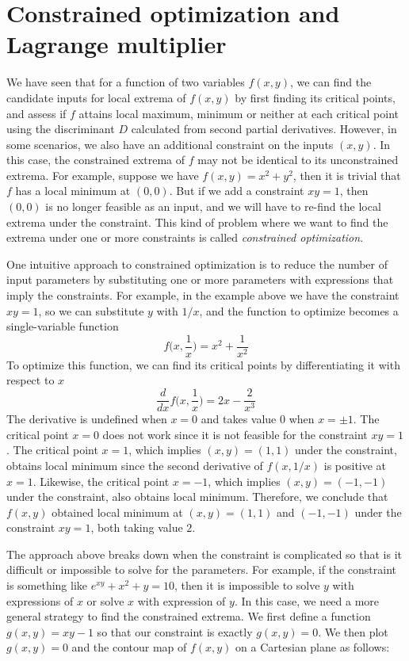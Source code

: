 \section{Constrained optimization and Lagrange multiplier}
We have seen that for a function of two variables $f(x,y)$, we can find the candidate inputs for local extrema of $f(x,y)$ by first finding its critical points, and assess if $f$ attains local maximum, minimum or neither at each critical point using the discriminant $D$ calculated from second partial derivatives.  However, in some scenarios, we also have an additional constraint on the inputs $(x,y)$.  In this case, the constrained extrema of $f$ may not be identical to its unconstrained extrema.  For example, suppose we have $f(x,y) = x^2+y^2$, then it is trivial that $f$ has a local minimum at $(0,0)$.  But if we add a constraint $xy = 1$, then $(0,0)$ is no longer feasible as an input, and we will have to re-find the local extrema under the constraint.  This kind of problem where we want to find the extrema under one or more constraints is called \textit{constrained optimization}.

One intuitive approach to constrained optimization is to reduce the number of input parameters by substituting one or more parameters with expressions that imply the constraints.  For example, in the example above we have the constraint $xy=1$, so we can substitute $y$ with $1/x$, and the function to optimize becomes a single-variable function
\[f\Big(x, \frac{1}{x}\Big) = x^2 + \frac{1}{x^2}\] 
To optimize this function, we can find its critical points by differentiating it with respect to $x$
\[\frac{d}{dx}f\Big(x, \frac{1}{x}\Big) = 2x - \frac{2}{x^3}\]
The derivative is undefined when $x = 0$ and takes value $0$ when $x = \pm 1$.  The critical point $x=0$ does not work since it is not feasible for the constraint $xy=1$.  The critical point $x=1$, which implies $(x,y) = (1,1)$ under the constraint, obtains local minimum since the second derivative of $f(x, 1/x)$ is positive at $x=1$.  Likewise, the critical point $x = -1$, which implies $(x,y) = (-1,-1)$ under the constraint, also obtains local minimum.  Therefore, we conclude that $f(x,y)$ obtained local minimum at $(x,y) = (1,1)$ and $(-1,-1)$ under the constraint $xy=1$, both taking value $2$.

The approach above breaks down when the constraint is complicated so that is it difficult or impossible to solve for the parameters.  For example, if the constraint is something like $e^{xy} + x^2 + y = 10$, then it is impossible to solve $y$ with expressions of $x$ or solve $x$ with expression of $y$.  In this case, we need a more general strategy to find the constrained extrema.  We first define a function $g(x,y) = xy -1$ so that our constraint is exactly $g(x,y) = 0$.  We then plot $g(x,y) = 0$ and the contour map of $f(x,y)$ on a Cartesian plane as follows:


